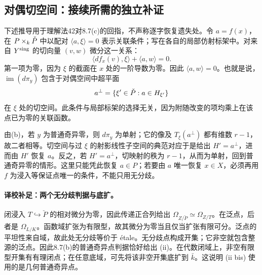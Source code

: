 \subsection*{对偶切空间：接续所需的独立补证}
下述推导用于理解法42对8.7(c)的回指，不声称逐字恢复遗失处。令 $a=f(x)$，在 $P\times_k\Pdual$ 中以配对 $\langle a,\xi\rangle=0$ 表示关联条件；写在各自的局部仿射标架中。对来自 $\Ysing$ 的切向量 $(v,w)$ 微分这一关系：
\[
 \langle df_x(v),\xi\rangle+\langle a,w\rangle=0.
\]
第一项为零，因为 $\xi$ 的截面在 $x$ 处的一阶导数为零。因此 $\langle a,w\rangle=0$。也就是说，$\operatorname{im}(d\pi_y)$ 包含于对偶空间中超平面
\[
 a^\perp=\{\xi'\in\Pdual : a\in H_{\xi'}\}
\]
在 $\xi$ 处的切空间。此条件与局部标架的选择无关，因为附随改变的项均乘上在该点已为零的关联函数。

由(b)，若 $y$ 为普通奇异零，则 $d\pi_y$ 为单射；它的像及 $T_\xi(a^\perp)$ 都有维数 $r-1$，故二者相等。切空间与过 $\xi$ 的射影线性子空间的典范对应于是给出 $H'=a^\perp$，进而由 $H'$ 恢复 $a$。反之，若 $H'=a^\perp$，切映射的秩为 $r-1$，从而为单射，回到普通奇异零的情形。这里只能凭此恢复 $a\in P$；若要由 $a$ 唯一恢复 $x\in X$，必须再用 $f$ 为浸入等保证点唯一的条件，不能只用无分歧。

\endgroup


\hypertarget{D18-106-notes}{}

\begingroup
\def\PP{\mathbb P}\def\OO{\mathcal O}\def\Ocal{\mathcal O}
\def\F{\mathcal F}\def\G{\mathcal G}\def\N{\mathcal N}
\def\PD{\check P}\def\Pdual{\check P}
\def\Ys{Y^{\mathrm{sing}}}\def\Ysing{Y^{\mathrm{sing}}}
\def\Ds{Y^{\mathrm{sup\,sing}}}\def\Ysup{Y^{\mathrm{sup\,sing}}}
\def\cod{\operatorname{codim}}\def\Sing{\operatorname{Sing}}
\def\depth{\operatorname{depth}}\def\coprof{\operatorname{coprof}}
\def\Ass{\operatorname{Ass}}\def\Supp{\operatorname{Supp}}
\def\Gr{\operatorname{Gr}}\def\Spec{\operatorname{Spec}}\def\Proj{\operatorname{Proj}}


\paragraph{译校补足：两个无分歧判据与底扩。}
闭浸入 $T\hookrightarrow\PD$ 的相对微分为零，因此传递正合列给出
$\Omega_{Z/\PD}\simeq\Omega_{Z/T}$。在泛点，后者是 $\Omega_{L/K}$。函数域扩张为有限型，故其微分为零当且仅当扩张有限可分。泛点的平坦性来自域，故此处无分歧等价于 étale。无分歧点构成开集；它非空就包含整源的泛点。因此8.7(b)的普通奇异点判据恰好给出 (ii)。在代数闭域上，非空有限型开集有有理闭点；在任意底域，可先将该非空开集底扩到 $\bar k$。这说明 (ii bis) 使用的是几何普通奇异点。

